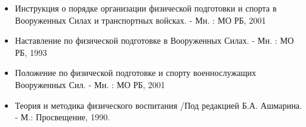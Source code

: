 \documentclass[a4paper]{article}
\begin{document}
    \begin{itemize}
        \item Инструкция о порядке организации физической подготовки и спорта в Вооруженных Силах и транспортных войсках. - Мн. : МО РБ, 2001
        \item Наставление по физической подготовке в Вооруженных Силах. - Мн. : МО РБ, 1993
        \item Положение по физической подготовке и спорту военнослужащих Вооруженных Сил. - Мн. : МО РБ, 2001
        \item Теория и методика физического воспитания /Под редакцией Б.А. Ашмарина. - М.: Просвещение, 1990.
    \end{itemize}
\end{document}
